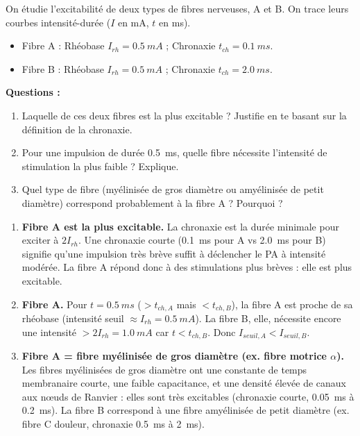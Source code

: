 \documentclass[11pt]{article}
\begin{document}
\begin{exercice}
On étudie l'excitabilité de deux types de fibres nerveuses, A et B. On trace leurs courbes intensité-durée ($I$ en mA, $t$ en ms).
\begin{itemize}
\item Fibre A : Rhéobase $I_{rh} = \SI{0,5}{mA}$ ; Chronaxie $t_{ch} = \SI{0,1}{ms}$.
\item Fibre B : Rhéobase $I_{rh} = \SI{0,5}{mA}$ ; Chronaxie $t_{ch} = \SI{2,0}{ms}$.
\end{itemize}
\textbf{Questions :}
\begin{enumerate}
\item Laquelle de ces deux fibres est la plus excitable ? Justifie en te basant sur la définition de la chronaxie.
\item Pour une impulsion de durée \SI{0,5}{ms}, quelle fibre nécessite l'intensité de stimulation la plus faible ? Explique.
\item Quel type de fibre (myélinisée de gros diamètre ou amyélinisée de petit diamètre) correspond probablement à la fibre A ? Pourquoi ?
\end{enumerate}
\end{exercice}

\begin{corrige}
\begin{enumerate}
\item \textbf{Fibre A est la plus excitable.} La chronaxie est la durée minimale pour exciter à $2 I_{rh}$. Une chronaxie courte (\SI{0,1}{ms} pour A vs \SI{2,0}{ms} pour B) signifie qu'une impulsion très brève suffit à déclencher le PA à intensité modérée. La fibre A répond donc à des stimulations plus brèves : elle est plus excitable.
\item \textbf{Fibre A.} Pour $t = \SI{0,5}{ms}$ ($> t_{ch,A}$ mais $< t_{ch,B}$), la fibre A est proche de sa rhéobase (intensité seuil $\approx I_{rh} = \SI{0,5}{mA}$). La fibre B, elle, nécessite encore une intensité $> 2 I_{rh} = \SI{1,0}{mA}$ car $t < t_{ch,B}$. Donc $I_{seuil,A} < I_{seuil,B}$.
\item \textbf{Fibre A = fibre myélinisée de gros diamètre (ex. fibre motrice $\alpha$).} Les fibres myélinisées de gros diamètre ont une constante de temps membranaire courte, une faible capacitance, et une densité élevée de canaux  aux nœuds de Ranvier : elles sont très excitables (chronaxie courte, \SI{0,05}{ms} à \SI{0,2}{ms}). La fibre B correspond à une fibre amyélinisée de petit diamètre (ex. fibre C douleur, chronaxie \SI{0,5}{ms} à \SI{2}{ms}).
\end{enumerate}
\end{corrige}
\end{document}
